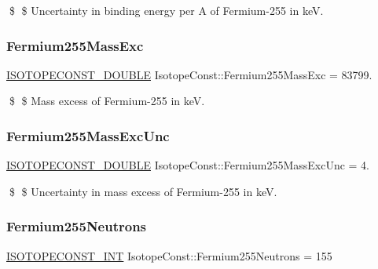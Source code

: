 \$ \$ Uncertainty in binding energy per A of Fermium-\/255 in keV. \mbox{\label{group___isotope_const-_fermium-_fm255_ga32d9cd8f6e2452449e6de861a46113cf}} 
\subsubsection{\texorpdfstring{Fermium255\+Mass\+Exc}{Fermium255MassExc}}
{\footnotesize\ttfamily \mbox{\hyperlink{group___isotope_const-_macros_ga8f45a7272ce02c0b4c65c44636ed719a}{I\+S\+O\+T\+O\+P\+E\+C\+O\+N\+S\+T\+\_\+\+D\+O\+U\+B\+LE}} Isotope\+Const\+::\+Fermium255\+Mass\+Exc = 83799.}

\$ \$ Mass excess of Fermium-\/255 in keV. \mbox{\label{group___isotope_const-_fermium-_fm255_ga7b6a2c0f40d350d0d8942e8cfc074327}} 
\subsubsection{\texorpdfstring{Fermium255\+Mass\+Exc\+Unc}{Fermium255MassExcUnc}}
{\footnotesize\ttfamily \mbox{\hyperlink{group___isotope_const-_macros_ga8f45a7272ce02c0b4c65c44636ed719a}{I\+S\+O\+T\+O\+P\+E\+C\+O\+N\+S\+T\+\_\+\+D\+O\+U\+B\+LE}} Isotope\+Const\+::\+Fermium255\+Mass\+Exc\+Unc = 4.}

\$ \$ Uncertainty in mass excess of Fermium-\/255 in keV. \mbox{\label{group___isotope_const-_fermium-_fm255_ga65653b584af8afb51ed5ec59e7b8dd64}} 
\subsubsection{\texorpdfstring{Fermium255\+Neutrons}{Fermium255Neutrons}}
{\footnotesize\ttfamily \mbox{\hyperlink{group___isotope_const-_macros_ga5f18360b3e99483a35c32d789e62621c}{I\+S\+O\+T\+O\+P\+E\+C\+O\+N\+S\+T\+\_\+\+I\+NT}} Isotope\+Const\+::\+Fermium255\+Neutrons = 155}

